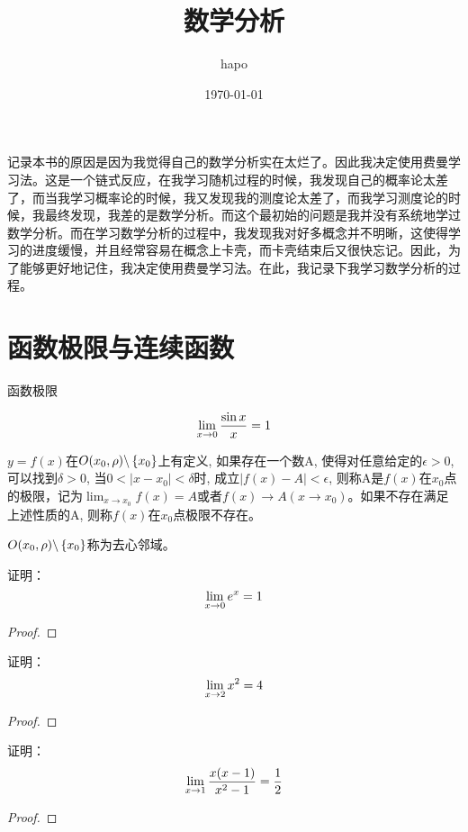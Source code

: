 \documentclass[lang=cn]{elegantbook}
\title{数学分析}
\author{hapo}
\date{\today}
\begin{document}
\maketitle
\frontmatter

\tableofcontents

\mainmatter
记录本书的原因是因为我觉得自己的数学分析实在太烂了。因此我决定使用费曼学习法。这是一个链式反应，在我学习随机过程的时候，我发现自己的概率论太差了，而当我学习概率论的时候，我又发现我的测度论太差了，而我学习测度论的时候，我最终发现，我差的是数学分析。而这个最初始的问题是我并没有系统地学过数学分析。而在学习数学分析的过程中，我发现我对好多概念并不明晰，这使得学习的进度缓慢，并且经常容易在概念上卡壳，而卡壳结束后又很快忘记。因此，为了能够更好地记住，我决定使用费曼学习法。在此，我记录下我学习数学分析的过程。



\chapter{函数极限与连续函数}
函数极限

\[ \lim_{x \to 0 } \frac{\sin x}{x} = 1 \]
\begin{definition}
    $y = f(x)$在$O(x_0, \rho) \backslash \left\{ x_0\right\}$上有定义, 如果存在一个数A, 使得对任意给定的$\epsilon > 0$, 可以找到$\delta > 0$, 当$0 < \left| x - x_0 \right| < \delta$时, 成立$\left| f(x) - A\right| < \epsilon$, 则称A是$f(x)$在$x_0$点的极限，记为$\lim_{x \to x_0} f(x) = A$或者$f(x) \to A (x \to x_0)$。如果不存在满足上述性质的A, 则称$f(x)$在$x_0$点极限不存在。
\end{definition}
$O(x_0, \rho) \backslash \left\{ x_0\right\}$称为去心邻域。

\begin{proposition}
    证明：
    \[ \lim_{x \to 0 } e^x = 1\]
\end{proposition}
\begin{proof}

\end{proof}

\begin{proposition}
    证明：
    \[ \lim_{x \to 2 } x^2 = 4 \]
\end{proposition}
\begin{proof}

\end{proof}

\begin{proposition}
    证明：
    \[ \lim_{x \to 1 } \frac{x(x-1)}{x^2-1} = \frac{1}{2} \]
\end{proposition}
\begin{proof}
    
\end{proof}
\end{document}

